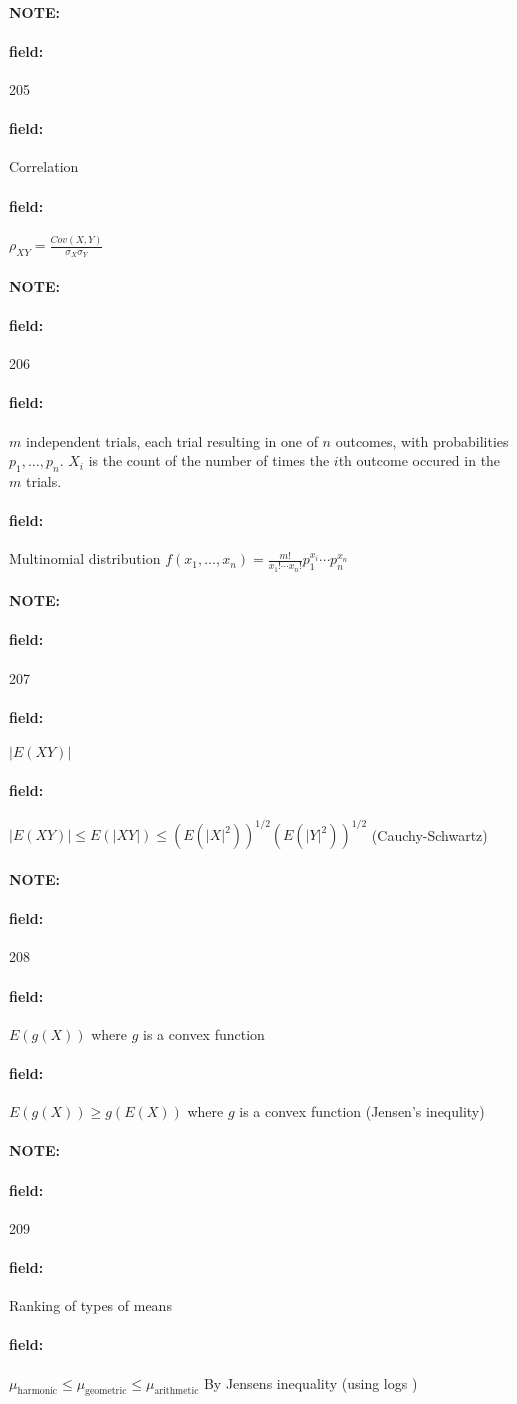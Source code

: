 \documentclass[12pt]{article}
\newenvironment{note}{\paragraph{NOTE:}}{}
\newenvironment{field}{\paragraph{field:}}{}
\begin{document}
\begin{note} \begin{field} \tiny 205 \end{field}
  \begin{field}
    Correlation
  \end{field}
  \begin{field}
    $\rho_{XY} = \frac{Cov(X,Y)}{\sigma_X\sigma_Y}$
  \end{field}
\end{note}

\begin{note} \begin{field} \tiny 206 \end{field}
  \begin{field}
    $m$ independent trials, each trial resulting in one of $n$ outcomes, with probabilities $p_1, \ldots, p_n$. $X_i$ is the count of the number of times the $i$th outcome occured in the $m$ trials.
  \end{field}
  \begin{field}
    Multinomial distribution
    $f(x_1, \ldots, x_n) = \frac{m!}{x_1! \cdots x_n!}p_1^{x_i} \cdots p_n^{x_n}$
  \end{field}
\end{note}

\begin{note} \begin{field} \tiny 207 \end{field}
  \begin{field}
    $|E(XY)| $
  \end{field}
  \begin{field}
    $|E(XY)| \leq E(|XY|) \leq (E(|X|^2))^{1/2}(E(|Y|^2))^{1/2}$ (Cauchy-Schwartz)
  \end{field}
\end{note}


\begin{note} \begin{field} \tiny 208 \end{field}
  \begin{field}
    $E(g(X)) $ where $g$ is a convex function
  \end{field}
  \begin{field}
    $E(g(X)) \geq g(E(X))$ where $g$ is a convex function (Jensen's inequlity)
  \end{field}
\end{note}

\begin{note} \begin{field} \tiny 209 \end{field}
  \begin{field}
    Ranking of types of means
  \end{field}
  \begin{field}
    $\mu_{\text{harmonic}} \leq \mu_{\text{geometric}} \leq \mu_{\text{arithmetic}}$ By Jensens inequality (using logs )
  \end{field}
\end{note}
\end{document}
